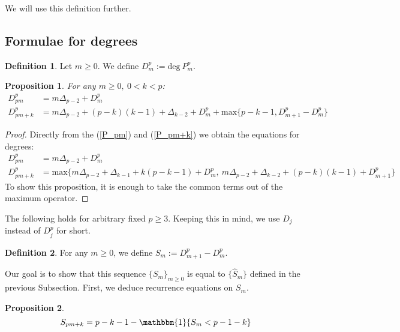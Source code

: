 \documentclass[a4paper]{article}
\theoremstyle{plain}
\newtheorem{proposition}{Proposition}[section]
\theoremstyle{definition}
\newtheorem{definition}{Definition}
\begin{document}
We will use this definition further.

\subsection{Formulae for degrees}
\begin{definition}
Let $m \ge 0$. We define $D_m^p := \mathrm{deg}\ P_m^p$.
\end{definition}
\begin{proposition} \label{dm_eq}
For any $m \ge 0,\ 0 < k < p$:
\begin{align*}
  D_{pm}^p &= m \Delta_{p-2} + D_m^p \\
  D_{pm+k}^p &= m \Delta_{p-2}+(p-k)(k-1)+\Delta_{k-2}+D_m^p + \mathrm{max}\{p-k-1, D_{m+1}^p-D_m^p\}
\end{align*}
\end{proposition}
\begin{proof}
Directly from the (\ref{P_pm}) and (\ref{P_pm+k}) we obtain the equations for degrees:
\begin{align*}
  D_{pm}^p &= m \Delta_{p-2} + D_m^p \\
  D_{pm+k}^p &= \mathrm{max}\{ m\Delta_{p-2} + \Delta_{k-1} + k(p-k-1) + D_m^p,\     
                                m\Delta_{p-2} + \Delta_{k-2} + (p-k)(k-1) + D_{m+1}^p \}
\end{align*}
To show this proposition, it is enough to take the common terms out of the maximum operator.
\end{proof}
The following holds for arbitrary fixed $p \ge 3$. Keeping this in mind, we use $D_j$ instead of $D_j^p$ for short.
\begin{definition} \label{sm_def}
For any $m \ge 0$, we define $S_m := D_{m+1}^p - D_m^p $.
\end{definition}
Our goal is to show that this sequence $\{S_m\}_{m \ge 0}$ is equal to $\{\hat{S}_m\}$ defined in the previous Subsection. First, we deduce recurrence equations on $S_m$.
\begin{proposition}
\begin{equation} \label{sm_eq}
S_{pm+k} = p-k-1 - \mathbbm{1}\{S_m < p-1-k\}
\end{equation}
\end{proposition}
\end{document}
